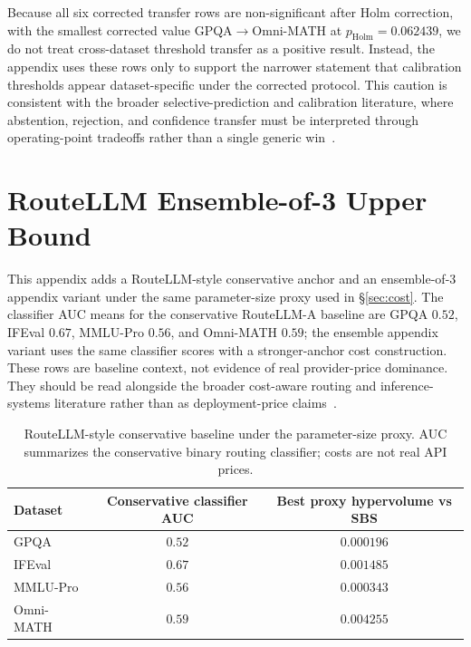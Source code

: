 \documentclass{article}
\begin{document}
Because all six corrected transfer rows are non-significant after Holm correction, with the smallest corrected value GPQA$\rightarrow$Omni-MATH at $p_{\text{Holm}}=0.062439$, we do not treat cross-dataset threshold transfer as a positive result. Instead, the appendix uses these rows only to support the narrower statement that calibration thresholds appear dataset-specific under the corrected protocol. This caution is consistent with the broader selective-prediction and calibration literature, where abstention, rejection, and confidence transfer must be interpreted through operating-point tradeoffs rather than a single generic win~\citep{elyaniv2010foundations, geifman2017selective, geifman2019selectivenet, cortes2016rejection, guo2017calibration}.

\section{RouteLLM Ensemble-of-3 Upper Bound}
\label{app:routellm}

This appendix adds a RouteLLM-style conservative anchor and an ensemble-of-3 appendix variant under the same parameter-size proxy used in \S\ref{sec:cost}. The classifier AUC means for the conservative RouteLLM-A baseline are GPQA $0.52$, IFEval $0.67$, MMLU-Pro $0.56$, and Omni-MATH $0.59$; the ensemble appendix variant uses the same classifier scores with a stronger-anchor cost construction. These rows are baseline context, not evidence of real provider-price dominance. They should be read alongside the broader cost-aware routing and inference-systems literature rather than as deployment-price claims~\citep{muqeeth2024phatgoose, kwon2023vllm, yu2022orca, pope2023scalinginference, zhong2024distserve}.

\begin{table}[h]
  \caption{RouteLLM-style conservative baseline under the parameter-size proxy. AUC summarizes the conservative binary routing classifier; costs are not real API prices.}
  \label{tab:app-routellm}
  \centering
  \small
  \begin{tabular}{lcc}
    \toprule
    Dataset & Conservative classifier AUC & Best proxy hypervolume vs SBS \\
    \midrule
    GPQA & $0.52$ & $0.000196$ \\
    IFEval & $0.67$ & $0.001485$ \\
    MMLU-Pro & $0.56$ & $0.000343$ \\
    Omni-MATH & $0.59$ & $0.004255$ \\
    \bottomrule
  \end{tabular}
\end{table}
\end{document}
